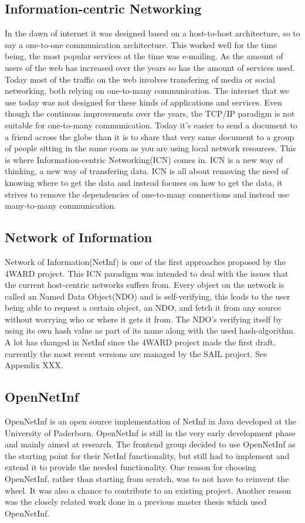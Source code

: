 \subsection{Information-centric Networking}
In the dawn of internet it was designed based on a host-to-host architecture, so to say a one-to-one communication architecture. This worked well for the time being, the most popular services at the time was e-mailing. As the amount of users of the web has increased over the years so has the amount of services used. Today most of the traffic on the web involves transfering of media or social networking, both relying on one-to-many communication. The internet that we use today was not designed for these kinds of applications and services. 
Even though the continous improvements over the years, the TCP/IP paradigm is not suitable for one-to-many communication. 
Today it's easier to send a document to a friend across the globe than it is to share that very same document to a group of people sitting in the same room as you are using local network resources\cite{ICNarticle}.
This is where Information-centric Networking(ICN) comes in. ICN is a new way of thinking, a new way of transfering data. ICN is all about removing the need of knowing where to get the data and instead focuses on how to get the data\cite{ICNarticle}, it strives to remove the dependencies of one-to-many connections and instead use many-to-many communication.

\subsection{Network of Information}
Network of Information(NetInf) is one of the first approaches proposed by the 4WARD project. \cite{4ward} This ICN paradigm was intended to deal with the issues that the current host-centric networks suffers from. Every object on the network is called an Named Data Object(NDO) and is self-verifying, this leads to the user being able to request a certain object, an NDO, and fetch it from any source without worrying who or where it gets it from. The NDO's verifying itself by using its own hash value as part of its name along with the used hash-algorithm.
A lot has changed in NetInf since the 4WARD project made the first draft, currently the most recent versions are managed by the SAIL project. See Appendix XXX.

\subsection{OpenNetInf}
OpenNetInf \cite{opennetinf} is an open source implementation of NetInf in Java developed at the University of Paderborn. OpenNetInf is still in the very early development phase and mainly aimed at research. The frontend group decided to use OpenNetInf as the starting point for their NetInf functionality, but still had to implement and extend it to provide the needed functionality. One reason for choosing OpenNetInf, rather than starting from scratch, was to not have to reinvent the wheel. It was also a chance to contribute to an existing project. Another reason was the closely related work done in a previous master thesis \cite{masterthesis} which used OpenNetInf.
